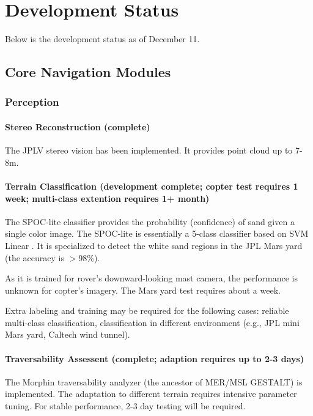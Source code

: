\documentclass[conference]{IEEEtran}
\begin{document}
\section{Development Status}

Below is the development status as of December 11.

\subsection{Core Navigation Modules}

\subsubsection{Perception}

\paragraph{Stereo Reconstruction (complete)}
The JPLV stereo vision has been implemented. It provides point cloud up to 7-8m. 

\paragraph{Terrain Classification (development complete; copter test requires 1 week; multi-class extention requires 1+ month)}
The SPOC-lite classifier provides the probability (confidence) of sand given a single color image. The SPOC-lite is essentially a 5-class classifier based on SVM Linear \cite{liblinear}. It is specialized to detect the white sand regions in the JPL Mars yard (the accuracy is $>$98\%).

As it is trained for rover's downward-looking mast camera, the performance is unknown for copter's imagery. The Mars yard test requires about a week. 

Extra labeling and training may be required for the following cases: reliable multi-class classification, classification in different environment (e.g., JPL mini Mars yard, Caltech wind tunnel). 


\paragraph{Traversability Assessent (complete; adaption requires up to 2-3 days)}
The Morphin traversability analyzer (the ancestor of MER/MSL GESTALT) is implemented. The adaptation to different terrain requires intensive parameter tuning. For stable performance, 2-3 day testing will be required.
\end{document}
